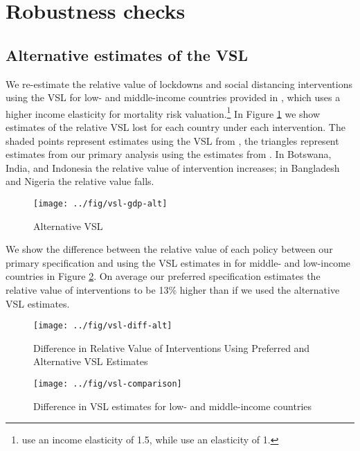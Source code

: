 \documentclass[11pt]{article}
\begin{document}
\clearpage

\appendix

\section{Robustness checks}

\subsection{Alternative estimates of the VSL}
\label{sec:alt-vsl}

We re-estimate the relative value of lockdowns and social distancing interventions using the VSL for low- and middle-income countries provided in \textcite{robinson2019}, which uses a higher income elasticity for mortality risk valuation.\footnote{\textcite{robinson2019} use an income elasticity of 1.5, while \textcite{viscusi2017} use an elasticity of 1.} In Figure \ref{fig:vsl-gdp-alt} we show estimates of the relative VSL lost for each country under each intervention. The shaded points represent estimates using the VSL from \textcite{robinson2019}, the triangles represent estimates from our primary analysis using the estimates from \textcite{viscusi2017}. In Botswana, India, and Indonesia the relative value of intervention increases; in Bangladesh and Nigeria the relative value falls. 


\begin{figure}[htbp!]
\centering
\caption{Alternative VSL}
\texttt{[image: ../fig/vsl-gdp-alt]}
\label{fig:vsl-gdp-alt}
\end{figure}

We show the difference between the relative value of each policy between our primary specification and using the VSL estimates in \textcite{robinson2019} for middle- and low-income countries in Figure \ref{fig:vsl-diff-alt}. On average our preferred specification estimates the relative value of interventions to be 13\% higher than if we used the alternative VSL estimates.   

\begin{figure}[htbp!]
\centering
\caption{Difference in Relative Value of Interventions Using Preferred and Alternative VSL Estimates}
\texttt{[image: ../fig/vsl-diff-alt]}
\label{fig:vsl-diff-alt}
\end{figure}


\begin{figure}[htbp!]
\centering
\caption{Difference in VSL estimates for low- and middle-income countries}
\texttt{[image: ../fig/vsl-comparison]}
\label{fig:vsl-comparison}
\end{figure}
\end{document}
